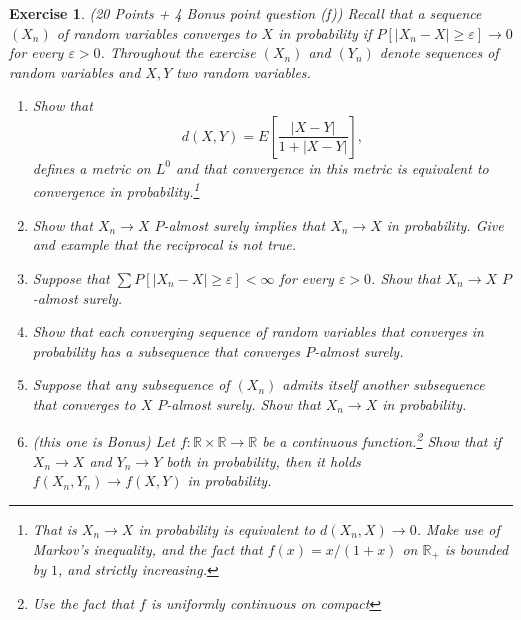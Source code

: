 \documentclass[DIV=classic,a4paper,10pt]{scrartcl}
\newtheorem{exercise}[theorem]{Exercise}
\theoremstyle{nonumberplain}
\numberwithin{equation}{section}
\begin{document}
\begin{exercise}(20 Points + 4 Bonus point question (f))
    Recall that a sequence $(X_n)$ of random variables converges to $X$ in probability if $P[|X_n-X|\geq \varepsilon]\to 0$ for every $\varepsilon>0$.
    Throughout the exercise $(X_n)$ and $(Y_n)$ denote sequences of random variables and $X,Y$ two random variables.
    \begin{enumerate}[label=(\alph*), fullwidth]
        \item Show that
            \begin{equation*}
                d(X,Y)=E\left[ \frac{|X-Y|}{1+|X-Y|} \right],
            \end{equation*}
            defines a metric on $L^0$ and that convergence in this metric is equivalent to convergence in probability.\footnote{That is $X_n\to X$ in probability is equivalent to $d(X_n,X)\to 0$. Make use of Markov's inequality, and the fact that $f(x)=x/(1+x)$ on $\mathbb{R}_+$ is bounded by $1$, and strictly increasing.}
        \item Show that $X_n \to X$ $P$-almost surely implies that $X_n\to X$ in probability.
            Give and example that the reciprocal is not true.
        \item Suppose that $\sum P[|X_n-X|\geq \varepsilon] <\infty$ for every $\varepsilon>0$.
            Show that $X_n\to X$ $P$-almost surely.
        \item Show that each converging sequence of random variables that converges in probability has a subsequence that converges $P$-almost surely.
                \item Suppose that any subsequence of $(X_n)$ admits itself another subsequence that converges to $X$ $P$-almost surely.
            Show that $X_n\to X$ in probability.
        \item (this one is Bonus) Let $f:\mathbb{R}\times \mathbb{R}\to \mathbb{R}$ be a continuous function.\footnote{Use the fact that $f$ is uniformly continuous on compact}
            Show that if $X_n\to X$ and $Y_n\to Y$ both in probability, then it holds $f(X_n,Y_n)\to f(X,Y)$ in probability.
    \end{enumerate}
\end{exercise}
\end{document}
